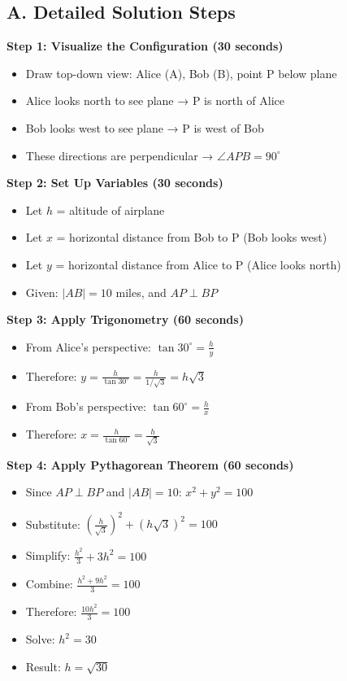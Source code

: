 \documentclass[12pt]{article}
\begin{document}
\begin{roadmapbox}
\subsection*{A. Detailed Solution Steps}

\textbf{Step 1: Visualize the Configuration (30 seconds)}
\begin{itemize}[leftmargin=*]
    \item Draw top-down view: Alice (A), Bob (B), point P below plane
    \item Alice looks north to see plane → P is north of Alice
    \item Bob looks west to see plane → P is west of Bob
    \item These directions are perpendicular → $\angle APB = 90^\circ$
\end{itemize}

\textbf{Step 2: Set Up Variables (30 seconds)}
\begin{itemize}[leftmargin=*]
    \item Let $h$ = altitude of airplane
    \item Let $x$ = horizontal distance from Bob to P (Bob looks west)
    \item Let $y$ = horizontal distance from Alice to P (Alice looks north)
    \item Given: $|AB| = 10$ miles, and $AP \perp BP$
\end{itemize}

\textbf{Step 3: Apply Trigonometry (60 seconds)}
\begin{itemize}[leftmargin=*]
    \item From Alice's perspective: $\tan 30^\circ = \frac{h}{y}$
    \item Therefore: $y = \frac{h}{\tan 30^\circ} = \frac{h}{1/\sqrt{3}} = h\sqrt{3}$
    \item From Bob's perspective: $\tan 60^\circ = \frac{h}{x}$
    \item Therefore: $x = \frac{h}{\tan 60^\circ} = \frac{h}{\sqrt{3}}$
\end{itemize}

\textbf{Step 4: Apply Pythagorean Theorem (60 seconds)}
\begin{itemize}[leftmargin=*]
    \item Since $AP \perp BP$ and $|AB| = 10$: $x^2 + y^2 = 100$
    \item Substitute: $\left(\frac{h}{\sqrt{3}}\right)^2 + (h\sqrt{3})^2 = 100$
    \item Simplify: $\frac{h^2}{3} + 3h^2 = 100$
    \item Combine: $\frac{h^2 + 9h^2}{3} = 100$
    \item Therefore: $\frac{10h^2}{3} = 100$
    \item Solve: $h^2 = 30$
    \item Result: $h = \sqrt{30}$
\end{itemize}


\end{roadmapbox}
\end{document}
